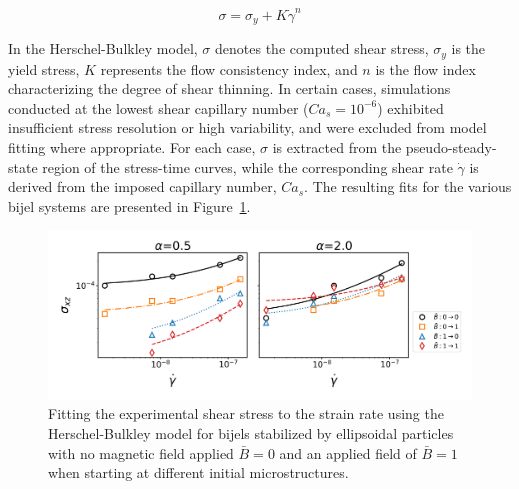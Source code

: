 \begin{equation}
    \sigma = \sigma_{y} + K\dot{\gamma}^{n}    
\end{equation}

In the Herschel-Bulkley model, $\sigma$ denotes the computed shear stress, $\sigma_y$ is the yield stress, $K$ represents the flow consistency index, 
and $n$ is the flow index characterizing the degree of shear thinning. In certain cases, simulations conducted at the lowest shear capillary number 
($Ca_s = 10^{-6}$) exhibited insufficient stress resolution or high variability, and were excluded from model fitting where appropriate. For each case, 
$\sigma$ is extracted from the pseudo-steady-state region of the stress-time curves, while the corresponding shear rate $\dot{\gamma}$ is derived from 
the imposed capillary number, $Ca_s$. The resulting fits for the various bijel systems are presented in Figure~\ref{fig:stress_strain}.

\begin{figure} 
    \centering 
    \includegraphics[scale=0.5]{../figures/results/paper3/stress_strain-all.png} 
    \caption{Fitting the experimental shear stress to the strain rate using the Herschel-Bulkley model for bijels stabilized by
             ellipsoidal particles with no magnetic field applied $\bar{B} = 0$ and an applied field of $\bar{B} = 1$ when starting at different
             initial microstructures.} 
    \label{fig:stress_strain} 
\end{figure}

